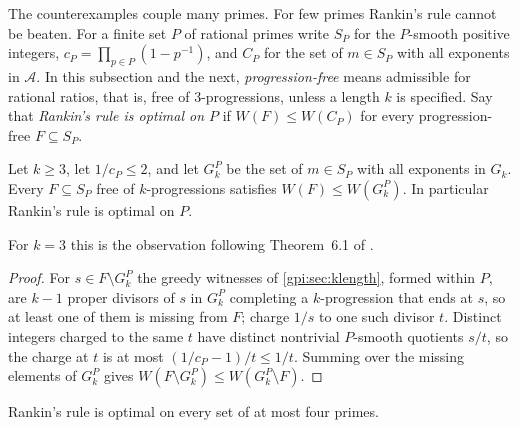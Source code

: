 The counterexamples couple many primes. For few primes Rankin's rule cannot be beaten. For a
finite set $P$ of rational primes write $S_P$ for the $P$-smooth positive integers,
$c_P=\prod_{p\in P}(1-p^{-1})$, and $C_P$ for the set of $m\in S_P$ with all exponents in
$\mathcal A$. In this subsection and the next, \emph{progression-free} means admissible for
rational ratios, that is, free of $3$-progressions, unless a length $k$ is specified. Say that \emph{Rankin's rule is optimal on $P$} if $W(F)\le W(C_P)$ for
every progression-free $F\subseteq S_P$.

\begin{proposition}\label{gpi:prop:light}
Let $k\ge3$, let $1/c_P\le2$, and let $G_k^P$ be the set of $m\in S_P$ with all exponents in $G_k$.
Every $F\subseteq S_P$ free of $k$-progressions satisfies $W(F)\le W(G_k^P)$. In particular Rankin's
rule is optimal on $P$.
\end{proposition}

For $k=3$ this is the observation following Theorem~6.1 of \cite{McNew2015Sets}.

\begin{proof}
For $s\in F\setminus G_k^P$ the greedy witnesses of \cref{gpi:sec:klength}, formed within $P$, are $k-1$
proper divisors of $s$ in $G_k^P$ completing a $k$-progression that ends at $s$, so at least one of
them is missing from $F$; charge $1/s$ to one such divisor $t$. Distinct integers charged to the
same $t$ have distinct nontrivial $P$-smooth quotients $s/t$, so the charge at $t$ is at most
$(1/c_P-1)/t\le1/t$. Summing over the missing elements of $G_k^P$ gives
$W(F\setminus G_k^P)\le W(G_k^P\setminus F)$.
\end{proof}

\begin{theorem}\label{gpi:thm:fourprimes}
Rankin's rule is optimal on every set of at most four primes.
\end{theorem}

